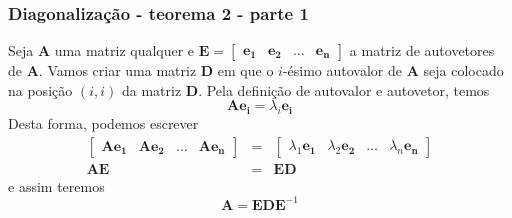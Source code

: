\begin{frame}[allowframebreaks]
  \frametitle{Diagonalização - teorema 2 - parte 1}

  Seja $\mathbf{A}$ uma matriz qualquer e $\mathbf{E} = \begin{bmatrix} \mathbf{e_1} & \mathbf{e_2} & \ldots & \mathbf{e_n} \end{bmatrix}$ a matriz de autovetores de $\mathbf{A}$.
  Vamos criar uma matriz $\mathbf{D}$ em que o $i$-ésimo autovalor de $\mathbf{A}$ seja colocado na posição $(i,i)$ da matriz $\mathbf{D}$. Pela definição de autovalor e autovetor, temos
  \begin{equation}
  \mathbf{A} \mathbf{e_i} = \lambda_i \mathbf{e_i}
  \end{equation}
  Desta forma, podemos escrever
  \begin{eqnarray}
  \begin{bmatrix} \mathbf{A} \mathbf{e_1} & \mathbf{A} \mathbf{e_2} & \ldots & \mathbf{A} \mathbf{e_n} \end{bmatrix} &=& \begin{bmatrix} \lambda_1 \mathbf{e_1} & \lambda_2 \mathbf{e_2} & \ldots & \lambda_n \mathbf{e_n} \end{bmatrix} \nonumber \\ 
  \mathbf{A} \mathbf{E} &=& \mathbf{E} \mathbf{D}
  \end{eqnarray}
  e assim teremos
  \begin{equation}
  \mathbf{A} = \mathbf{E} \mathbf{D} \mathbf{E}^{-1}
  \end{equation}
\end{frame}

